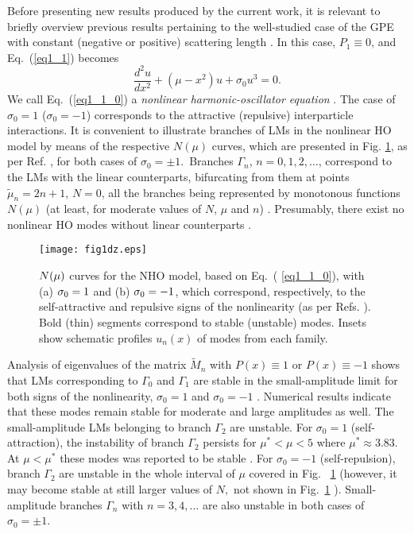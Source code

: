 \documentclass[aps,preprint,showkeys,
]{revtex4}
\begin{document}
Before presenting new results produced by the current work, it is relevant
to briefly overview previous results pertaining to the well-studied case of
the GPE with constant (negative or positive) scattering length \cite%
{E95,K99, G99, C01, YYB02, KK03, KAT01,AZ07,ZAKP08}. In this case, $%
P_{1}\equiv 0$, and Eq.~(\ref{eq1_1}) becomes
\begin{equation}
\frac{d^{2}u}{dx^{2}}+(\mu -x^{2})u+\sigma _{0}u^{3}=0.  \label{eq1_1_0}
\end{equation}%
We call Eq.~(\ref{eq1_1_0}) a \textit{nonlinear harmonic-oscillator equation}%
. The case of $\sigma _{0}=1$ ($\sigma _{0}=-1$) corresponds to the
attractive (repulsive) interparticle interactions. It is convenient to
illustrate branches of LMs in the nonlinear HO model by means of the
respective $N(\mu )$ curves, which are presented in Fig. \ref{Fig.P_1=1}, as
per Ref. \cite{ZAKP07,ZAKP08}, for both cases of $\sigma _{0}=\pm 1$.\
Branches $\Gamma _{n}$, $n=0,1,2,\ldots $, correspond to the LMs with the
linear counterparts, bifurcating from them at points $\tilde{\mu}_{n}=2n+1$,
$N=0$, all the branches being represented by monotonous functions $N(\mu )$
(at least, for moderate values of $N$, $\mu $ and $n$) . Presumably, there
exist no nonlinear HO modes without linear counterparts \cite{AZ07}.

\begin{figure}[tbp]
\texttt{[image: fig1dz.eps]}%
\caption{$N(\protect\mu )$ curves for the NHO model, based on Eq.~(\protect
\ref{eq1_1_0}), with (a) $\protect\sigma _{0}=1$ and (b) $\protect\sigma %
_{0}=-1$, which correspond, respectively, to the self-attractive and
repulsive signs of the nonlinearity (as per Refs. \protect\cite%
{ZAKP07,ZAKP08}). Bold (thin) segments correspond to stable (unstable)
modes. Insets show schematic profiles $u_{n}(x)$ of modes from each family.}
\label{Fig.P_1=1}
\end{figure}

Analysis of eigenvalues of the matrix $\tilde{M}_{n}$ with $P(x)\equiv 1$ or
$P(x)\equiv -1$ \cite{ZAKP08} shows that LMs corresponding to $\Gamma _{0}$
and $\Gamma _{1}$ are stable in the small-amplitude limit for both signs of
the nonlinearity, $\sigma _{0}=1$ and $\sigma _{0}=-1$ \cite{AZ07,KKRF05}.
Numerical results indicate that these modes remain stable for moderate and
large amplitudes as well. The small-amplitude LMs belonging to branch $%
\Gamma _{2}$ are unstable. For $\sigma _{0}=1$ (self-attraction), the
instability of branch $\Gamma _{2}$ persists for $\mu ^{\ast }<\mu <5$ where
$\mu ^{\ast }\approx 3.83$. At $\mu <\mu ^{\ast }$ these modes was reported
to be stable \cite{AZ07}. For $\sigma _{0}=-1$ (self-repulsion), branch $%
\Gamma _{2}$ are unstable in the whole interval of $\mu $ covered in Fig.~%
\ref{Fig.P_1=1} (however, it may become stable at still larger values of $N,$
not shown in Fig.~\ref{Fig.P_1=1} \cite{C10}). Small-amplitude branches $%
\Gamma _{n}$ with $n=3,4,\ldots $ are also unstable in both cases of $\sigma
_{0}=\pm 1$.
\end{document}
